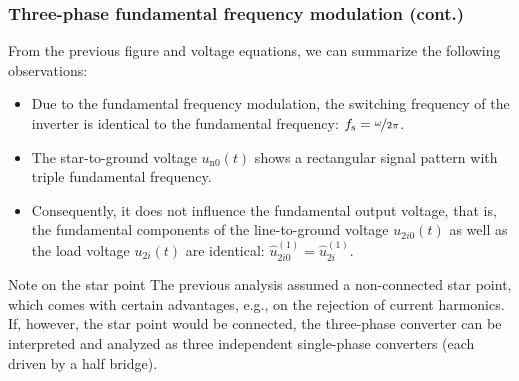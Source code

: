\begin{frame}
    \frametitle{Three-phase fundamental frequency modulation (cont.)} 
    From the previous figure and voltage equations, we can summarize the following observations:
    \begin{itemize}
        \item Due to the fundamental frequency modulation, the switching frequency of the inverter is identical to the fundamental frequency: $f_{\mathrm{s}} = \nicefrac{\omega}{2\pi}$.
        \item The star-to-ground voltage $u_{\mathrm{n0}}(t)$ shows a rectangular signal pattern with triple fundamental frequency. 
        \item Consequently, it does not influence the fundamental output voltage, that is, the fundamental components of the line-to-ground voltage $u_{2i0}(t)$ as well as the load voltage $u_{2i}(t)$ are identical: $\hat{u}^{(1)}_{2i0}=\hat{u}^{(1)}_{2i}$.
    \end{itemize}\vspace{-0.25cm}
    \begin{varblock}{Note on the star point}
        The previous analysis assumed a non-connected star point, which comes with certain advantages, e.g., on the rejection of current harmonics. If, however, the star point would be connected, the three-phase converter can be interpreted and analyzed as three independent single-phase converters (each driven by a half bridge). 
    \end{varblock}
\end{frame}

